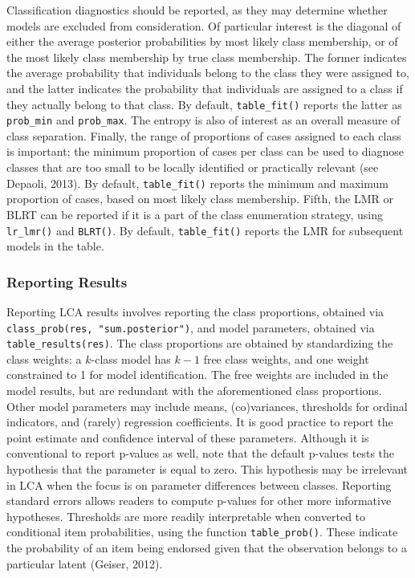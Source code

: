 \documentclass[
  ,man,floatsintext]{apa6}
\begin{document}
Classification diagnostics should be reported,
as they may determine whether models are excluded from consideration.
Of particular interest is the diagonal of either the average posterior probabilities by most likely class membership,
or of the most likely class membership by true class membership.
The former indicates the average probability that individuals belong to the class they were assigned to,
and the latter indicates the probability that individuals are assigned to a class if they actually belong to that class.
By default, \texttt{table\_fit()} reports the latter as \texttt{prob\_min} and \texttt{prob\_max}.
The entropy is also of interest as an overall measure of class separation.
Finally, the range of proportions of cases assigned to each class is important;
the minimum proportion of cases per class can be used to diagnose classes that are too small to be locally identified or practically relevant (see Depaoli, 2013).
By default, \texttt{table\_fit()} reports the minimum and maximum proportion of cases,
based on most likely class membership.
Fifth, the LMR or BLRT can be reported if it is a part of the class enumeration strategy, using \texttt{lr\_lmr()} and \texttt{BLRT()}.
By default, \texttt{table\_fit()} reports the LMR for subsequent models in the table.

\hypertarget{reporting-results}{%
\subsubsection{Reporting Results}\label{reporting-results}}

Reporting LCA results involves reporting the class proportions,
obtained via \texttt{class\_prob(res,\ "sum.posterior")},
and model parameters, obtained via \texttt{table\_results(res)}.
The class proportions are obtained by standardizing the class weights:
a \(k\)-class model has \(k-1\) free class weights,
and one weight constrained to 1 for model identification.
The free weights are included in the model results,
but are redundant with the aforementioned class proportions.
Other model parameters may include means, (co)variances, thresholds for ordinal indicators, and (rarely) regression coefficients.
It is good practice to report the point estimate and confidence interval of these parameters.
Although it is conventional to report p-values as well,
note that the default p-values tests the hypothesis that the parameter is equal to zero.
This hypothesis may be irrelevant in LCA when the focus is on parameter differences between classes.
Reporting standard errors allows readers to compute p-values for other more informative hypotheses.
Thresholds are more readily interpretable when converted to conditional item probabilities, using the function \texttt{table\_prob()}.
These indicate the probability of an item being
endorsed given that the observation belongs to a particular latent (Geiser, 2012).
\end{document}
